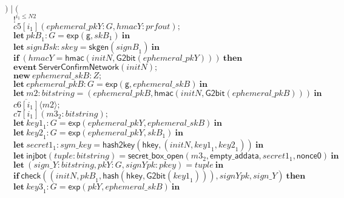 \documentclass{article}
\newcommand{\cinput}[2]{{#1}({#2})}
\newcommand{\coutput}[2]{\overline{#1}\langle{#2}\rangle}
\newcommand{\kw}[1]{\mathbf{#1}}
\newcommand{\kwf}[1]{\mathsf{#1}}
\newcommand{\var}[1]{\mathit{#1}}
\newcommand{\kwt}[1]{\mathit{#1}}
\newcommand{\kwp}[1]{\mathit{#1}}
\newcommand{\kwc}[1]{\mathit{#1}}
\begin{document}
\begin{tabbing}
\>$) \mid ($\\
\>$\quad !^{\var{i}_{1} \leq \kwp{N2}}$\\
\>$\quad \cinput{\kwc{c5}[\var{i}_{1}]}{\var{ephemeral{\_}pkY}: \kwt{G}, \var{hmacY}: \kwt{prfout}};$\\
\>$\quad \kw{let}\ \var{pkB}_{1}: \kwt{G} = \kwf{exp}(\kwf{g}, \var{skB}_{1})\ \kw{in}$\\
\>$\quad \kw{let}\ \var{signBsk}: \kwt{skey} = \kwf{skgen}(\var{signB}_{1})\ \kw{in}$\\
\>$\quad \kw{if}\ (\var{hmacY}  =  \kwf{hmac}(\var{initN}, \kwf{G2bit}(\var{ephemeral{\_}pkY})))\ \kw{then}$\\
\>$\quad \kw{event}\ \kwf{ServerConfirmNetwork}(\var{initN});$\\
\>$\quad \kw{new}\ \var{ephemeral{\_}skB}: \kwt{Z};$\\
\>$\quad \kw{let}\ \var{ephemeral{\_}pkB}: \kwt{G} = \kwf{exp}(\kwf{g}, \var{ephemeral{\_}skB})\ \kw{in}$\\
\>$\quad \kw{let}\ \var{m2}: \kwt{bitstring} = \kwf{}(\var{ephemeral{\_}pkB}, \kwf{hmac}(\var{initN}, \kwf{G2bit}(\var{ephemeral{\_}pkB})))\ \kw{in}$\\
\>$\quad \coutput{\kwc{c6}[\var{i}_{1}]}{\var{m2}};$\\
\>$\quad \cinput{\kwc{c7}[\var{i}_{1}]}{\var{m3}_{2}: \kwt{bitstring}};$\\
\>$\quad \kw{let}\ \var{key1}_{1}: \kwt{G} = \kwf{exp}(\var{ephemeral{\_}pkY}, \var{ephemeral{\_}skB})\ \kw{in}$\\
\>$\quad \kw{let}\ \var{key2}_{1}: \kwt{G} = \kwf{exp}(\var{ephemeral{\_}pkY}, \var{skB}_{1})\ \kw{in}$\\
\>$\quad \kw{let}\ \var{secret1}_{1}: \kwt{sym{\_}key} = \kwf{hash2key}(\kwf{hkey}, \kwf{}(\var{initN}, \var{key1}_{1}, \var{key2}_{1}))\ \kw{in}$\\
\>$\quad \kw{let}\ \kwf{injbot}(\var{tuple}: \kwt{bitstring}) = \kwf{secret{\_}box{\_}open}(\var{m3}_{2}, \kwf{empty{\_}addata}, \var{secret1}_{1}, \kwf{nonce0})\ \kw{in}$\\
\>$\quad \kw{let}\ \kwf{}(\var{sign{\_}Y}: \kwt{bitstring}, \var{pkY}: \kwt{G}, \var{signYpk}: \kwt{pkey}) = \var{tuple}\ \kw{in}$\\
\>$\quad \kw{if}\ \kwf{check}(\kwf{}(\var{initN}, \var{pkB}_{1}, \kwf{hash}(\kwf{hkey}, \kwf{G2bit}(\var{key1}_{1}))), \var{signYpk}, \var{sign{\_}Y})\ \kw{then}$\\
\>$\quad \kw{let}\ \var{key3}_{1}: \kwt{G} = \kwf{exp}(\var{pkY}, \var{ephemeral{\_}skB})\ \kw{in}$\\

\end{tabbing}
\end{document}
